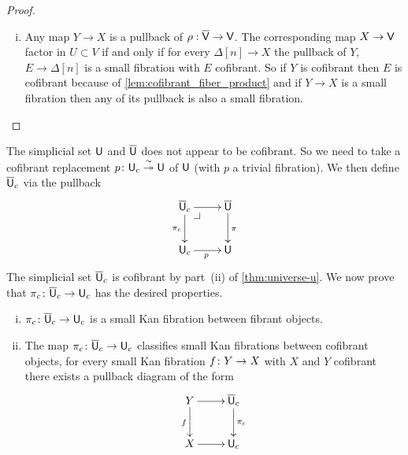 \documentclass[reqno,10pt,a4paper,oneside,draft]{amsart}
\begin{document}
\begin{proof}
\begin{enumerate}[(i)]
\item Any map $Y \rightarrow X$ is a pullback of $\rho: \overline{\mathsf{V}} \rightarrow \mathsf{V}$. The corresponding map $X \rightarrow \mathsf{V}$ factor in $U \subset V$ if and only if for every $\Delta[n] \rightarrow X$ the pullback of $Y$, $E \rightarrow \Delta[n]$ is a small fibration with $E$ cofibrant. So if $Y$ is cofibrant then $E$ is cofibrant because of \ref{lem:cofibrant_fiber_product} and if $Y \rightarrow X$ is a small fibration then any of its pullback is also a small fibration.

 \qedhere
\end{enumerate}
\end{proof} 



The simplicial set $\mathsf{U}$ and $\overline{\mathsf{U}}$ does not appear to be cofibrant. So we need to take a cofibrant replacement $p \colon \mathsf{U}_c \overset{\sim}{\twoheadrightarrow} \mathsf{U}$ of $\mathsf{U}$ (with $p$ a trivial fibration). 
We then define $\overline{\mathsf{U}}_c$ via the pullback
\[
\xymatrix{
\UU_c \ar[d]_{\pi_c} \ar[r] \drpullback & \UU \ar[d]^{\pi}  \\
\U_c \ar[r]_p & \U}
\]
The simplicial set $\overline{\mathsf{U}}_c$ is cofibrant by part~(ii) of \cref{thm:universe-u}.  We now prove that $\pi_c \colon \overline{\mathsf{U}}_c \to \mathsf{U}_c$ has the desired properties.


\begin{proposition} \label{thm:universe-uc} 
\hfill 
\begin{enumerate}[(i)] 
\item $\pi_c \colon \overline{\mathsf{U}}_c \to \mathsf{U}_c$ is a small Kan fibration between fibrant objects. 
\item The map $\pi_c \colon \overline{\mathsf{U}}_c \to \mathsf{U}_c$ classifies small Kan fibrations between cofibrant objects, \ie 
for every small Kan fibration $f \colon Y \to X$ with $X$ and $Y$ cofibrant there exists a pullback diagram of the form
\[
\xymatrix{
Y \ar[r] \ar[d]_f & \UU_c \ar[d]^{\pi_c} \\
X \ar[r] & \U_c }
\]

\end{enumerate}
\end{proposition}
\end{document}
